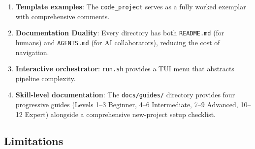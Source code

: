 \documentclass[
]{article}
\providecommand{\tightlist}{%
  \setlength{\itemsep}{0pt}\setlength{\parskip}{0pt}}
\begin{document}
\begin{enumerate}
\def\labelenumi{\arabic{enumi}.}
\tightlist
\item
  \textbf{Template examples}: The \texttt{code\_project} serves as a
  fully worked exemplar with comprehensive comments.
\item
  \textbf{Documentation Duality}: Every directory has both
  \texttt{README.md} (for humans) and \texttt{AGENTS.md} (for AI
  collaborators), reducing the cost of navigation.
\item
  \textbf{Interactive orchestrator}: \texttt{run.sh} provides a TUI menu
  that abstracts pipeline complexity.
\item
  \textbf{Skill-level documentation}: The \texttt{docs/guides/}
  directory provides four progressive guides (Levels 1--3 Beginner, 4--6
  Intermediate, 7--9 Advanced, 10--12 Expert) alongside a comprehensive
  new-project setup checklist.
\end{enumerate}

\subsection{Limitations}\label{limitations}
\end{document}
